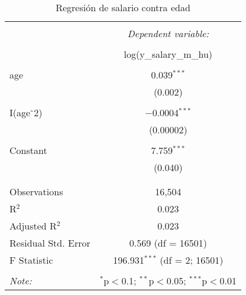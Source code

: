 
\begin{table}[!htbp] \centering 
  \caption{Regresión de salario contra edad} 
  \label{} 
\begin{tabular}{@{\extracolsep{5pt}}lc} 
\\[-1.8ex]\hline 
\hline \\[-1.8ex] 
 & \multicolumn{1}{c}{\textit{Dependent variable:}} \\ 
\cline{2-2} 
\\[-1.8ex] & log(y\_salary\_m\_hu) \\ 
\hline \\[-1.8ex] 
 age & 0.039$^{***}$ \\ 
  & (0.002) \\ 
  & \\ 
 I(age$\hat{\mkern6mu}$2) & $-$0.0004$^{***}$ \\ 
  & (0.00002) \\ 
  & \\ 
 Constant & 7.759$^{***}$ \\ 
  & (0.040) \\ 
  & \\ 
\hline \\[-1.8ex] 
Observations & 16,504 \\ 
R$^{2}$ & 0.023 \\ 
Adjusted R$^{2}$ & 0.023 \\ 
Residual Std. Error & 0.569 (df = 16501) \\ 
F Statistic & 196.931$^{***}$ (df = 2; 16501) \\ 
\hline 
\hline \\[-1.8ex] 
\textit{Note:}  & \multicolumn{1}{r}{$^{*}$p$<$0.1; $^{**}$p$<$0.05; $^{***}$p$<$0.01} \\ 
\end{tabular} 
\end{table} 
